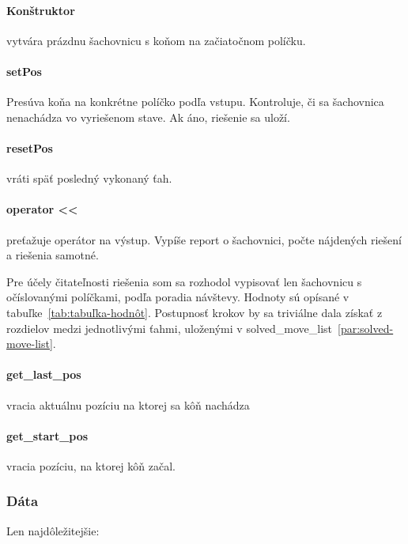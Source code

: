 \paragraph{Konštruktor} vytvára prázdnu šachovnicu s koňom na začiatočnom
políčku.

\paragraph{setPos} Presúva koňa na konkrétne políčko podľa vstupu.
Kontroluje, či sa šachovnica nenachádza vo vyriešenom stave.
Ak áno, riešenie sa uloží.

\paragraph{resetPos} vráti späť posledný vykonaný ťah.

\paragraph{operator <<} preťažuje operátor na výstup.
Vypíše report o šachovnici, počte nájdených riešení a riešenia samotné.

Pre účely čitateľnosti riešenia som sa rozhodol vypisovať len šachovnicu
s očíslovanými políčkami, podľa poradia návštevy.
Hodnoty sú opísané v tabuľke~\ref{tab:tabuľka-hodnôt}.
Postupnosť krokov by sa triviálne dala získať z rozdielov medzi jednotlivými ťahmi,
uloženými v solved\_move\_list~\ref{par:solved-move-list}.

\paragraph{get\_last\_pos} vracia aktuálnu pozíciu na ktorej sa kôň nachádza

\paragraph{get\_start\_pos} vracia pozíciu, na ktorej kôň začal.

\subsubsection{Dáta}\label{subsec:dáta}
Len najdôležitejšie:

